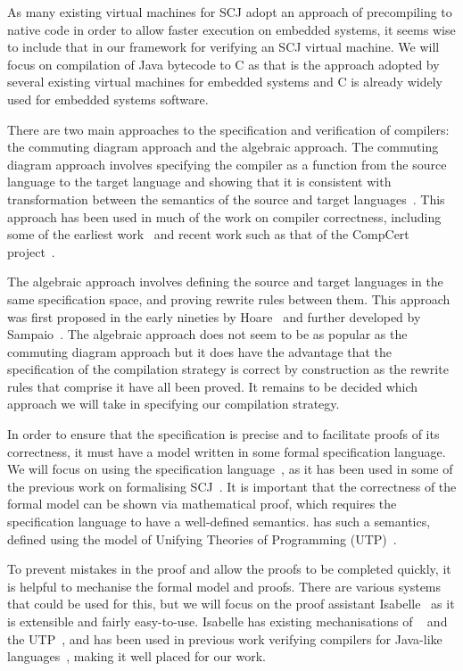 \documentclass[a4paper,10pt]{report}
\begin{document}
As many existing virtual machines for SCJ adopt an approach of precompiling to
native code in order to allow faster execution on embedded systems, it seems
wise to include that in our framework for verifying an SCJ virtual machine.  We
will focus on compilation of Java bytecode to C as that is the approach adopted
by several existing virtual machines for embedded systems and C is already
widely used for embedded systems software.

There are two main approaches to the specification and verification of
compilers: the commuting diagram approach and the algebraic approach.  The
commuting diagram approach involves specifying the compiler as a function from
the source language to the target language and showing that it is consistent
with transformation between the semantics of the source and target
languages~\cite{morris1973, thatcher1979}.  This approach has been used in much
of the work on compiler correctness, including some of the earliest
work~\cite{mccarthy1967} and recent work such as that of the CompCert
project~\cite{leroy2009a, leroy2009b}.

The algebraic approach involves defining the source and target languages in the
same specification space, and proving rewrite rules between them. This approach
was first proposed in the early nineties by Hoare~\cite{hoare1991} and further
developed by Sampaio~\cite{hoare1993, sampaio1993}.  The algebraic approach
does not seem to be as popular as the commuting diagram approach but it does
have the advantage that the specification of the compilation strategy is correct
by construction as the rewrite rules that comprise it have all been proved. It
remains to be decided which approach we will take in specifying our compilation
strategy.

In order to ensure that the specification is precise and to facilitate proofs of
its correctness, it must have a model written in some formal specification
language.  We will focus on using the \Circus{} specification
language~\cite{oliveira2009}, as it has been used in some of the previous work
on formalising SCJ~\cite{cavalcanti2011, cavalcanti2013}.  It is important that
the correctness of the formal model can be shown via mathematical proof, which
requires the specification language to have a well-defined semantics.  \Circus{}
has such a semantics, defined using the model of Unifying Theories of
Programming (UTP)~\cite{hoare1998}.

To prevent mistakes in the proof and allow the proofs to be completed quickly,
it is helpful to mechanise the formal model and proofs.  There are various
systems that could be used for this, but we will focus on the proof assistant
Isabelle~\cite{nipkow2002, nipkow2014} as it is extensible and fairly
easy-to-use. Isabelle has existing mechanisations of \Circus{}~\cite{joshi2012}
and the UTP~\cite{foster2015}, and has been used in previous work verifying
compilers for Java-like languages~\cite{klein2006, nipkow2000, lochbihler2010},
making it well placed for our work.
\end{document}

